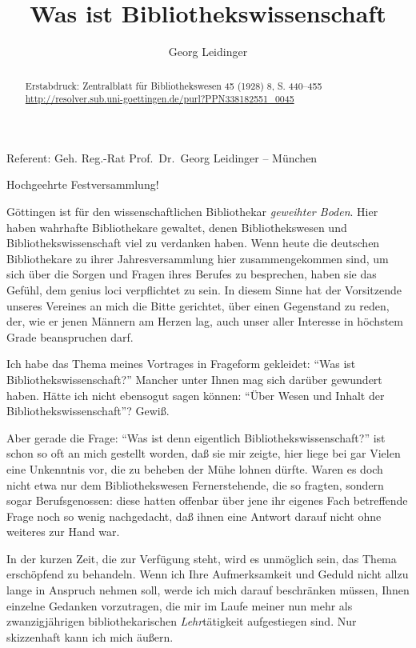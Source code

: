 \documentclass[a4paper,
fontsize=11pt,
oneside,
numbers=noperiodatend,
parskip=half-,
bibliography=totoc,
final
]{scrartcl}
\title{\LARGE{Was ist Bibliothekswissenschaft}}%
\author{Georg Leidinger} %
\date{}
\begin{document}
\maketitle
\thispagestyle{fancyplain} 

\begin{abstract}
\noindent Erstabdruck: Zentralblatt für Bibliothekswesen 45 (1928) 8, S. 440--455\\
\href{http://resolver.sub.uni-goettingen.de/purl?PPN338182551\_0045}{http://resolver.sub.uni-goettingen.de/purl?PPN338182551\_0045}
\end{abstract}

\vspace*{1em}
Referent: Geh. Reg.-Rat Prof.~Dr.~Georg Leidinger -- München
\vspace*{1em}

Hochgeehrte Festversammlung!

Göttingen ist für den wissenschaftlichen Bibliothekar \emph{geweihter
Boden}. Hier haben wahrhafte Bibliothekare gewaltet, denen
Bibliothekswesen und Bibliothekswissenschaft viel zu verdanken haben.
Wenn heute die deutschen Bibliothekare zu ihrer Jahresversammlung hier
zusammengekommen sind, um sich über die Sorgen und Fragen ihres Berufes
zu besprechen, haben sie das Gefühl, dem genius loci verpflichtet zu
sein. In diesem Sinne hat der Vorsitzende unseres Vereines an mich die
Bitte gerichtet, über einen Gegenstand zu reden, der, wie er jenen
Männern am Herzen lag, auch unser aller Interesse in höchstem Grade
beanspruchen darf.

Ich habe das Thema meines Vortrages in Frageform gekleidet: \enquote{Was
ist Bibliothekswissenschaft?} Mancher unter Ihnen mag sich darüber
gewundert haben. Hätte ich nicht ebensogut sagen können: \enquote{Über
Wesen und Inhalt der Bibliothekswissenschaft}? Gewiß.

Aber gerade die Frage: \enquote{Was ist denn eigentlich
Bibliothekswissenschaft?} ist schon so oft an mich gestellt worden, daß
sie mir zeigte, hier liege bei gar Vielen eine Unkenntnis vor, die zu
beheben der Mühe lohnen dürfte. Waren es doch nicht etwa nur dem
Bibliothekswesen Fernerstehende, die so fragten, sondern sogar
Berufsgenossen: diese hatten offenbar über jene ihr eigenes Fach
betreffende Frage noch so wenig nachgedacht, daß ihnen eine Antwort
darauf nicht ohne weiteres zur Hand war.

In der kurzen Zeit, die zur Verfügung steht, wird es unmöglich sein, das
Thema erschöpfend zu behandeln. Wenn ich Ihre Aufmerksamkeit und Geduld
nicht allzu lange in Anspruch nehmen soll, werde ich mich darauf
beschränken müssen, Ihnen einzelne Gedanken vorzutragen, die mir im
Laufe meiner nun mehr als zwanzigjährigen bibliothekarischen
\emph{Lehr}tätigkeit aufgestiegen sind. Nur skizzenhaft kann ich mich
äußern.
\end{document}
